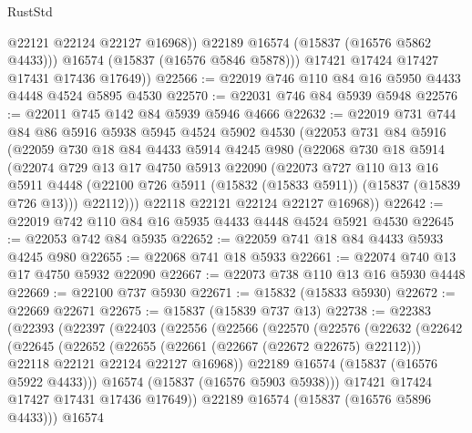 \begin{lexlean}{RustStd}
\begin{coremodule}
                @22121
                @22124
                @22127
                @16968))
            @22189
            @16574
            (@15837 (@16576 @5862 @4433)))
          @16574
          (@15837 (@16576 @5846 @5878)))
        @17421
        @17424
        @17427
        @17431
        @17436
        @17649))
@22566 := @22019 @746 @110 @84 @16 @5950 @4433 @4448 @4524 @5895 @4530
@22570 := @22031 @746 @84 @5939 @5948
@22576 := @22011 @745 @142 @84 @5939 @5946 @4666
@22632 := @22019
    @731
    @744
    @84
    @86
    @5916
    @5938
    @5945
    @4524
    @5902
    @4530
    (@22053
      @731
      @84
      @5916
      (@22059
        @730
        @18
        @84
        @4433
        @5914
        @4245
        @980
        (@22068
          @730
          @18
          @5914
          (@22074
            @729
            @13
            @17
            @4750
            @5913
            @22090
            (@22073
              @727
              @110
              @13
              @16
              @5911
              @4448
              (@22100 @726 @5911 (@15832 (@15833 @5911)) (@15837 (@15839 @726 @13)))
              @22112)))
        @22118
        @22121
        @22124
        @22127
        @16968))
@22642 := @22019 @742 @110 @84 @16 @5935 @4433 @4448 @4524 @5921 @4530
@22645 := @22053 @742 @84 @5935
@22652 := @22059 @741 @18 @84 @4433 @5933 @4245 @980
@22655 := @22068 @741 @18 @5933
@22661 := @22074 @740 @13 @17 @4750 @5932 @22090
@22667 := @22073 @738 @110 @13 @16 @5930 @4448
@22669 := @22100 @737 @5930
@22671 := @15832 (@15833 @5930)
@22672 := @22669 @22671
@22675 := @15837 (@15839 @737 @13)
@22738 := @22383
    (@22393
      (@22397
        (@22403
          (@22556
            (@22566
              (@22570
                (@22576
                  (@22632
                    (@22642
                      (@22645
                        (@22652
                          (@22655 (@22661 (@22667 (@22672 @22675) @22112)))
                          @22118
                          @22121
                          @22124
                          @22127
                          @16968))
                      @22189
                      @16574
                      (@15837 (@16576 @5922 @4433)))
                    @16574
                    (@15837 (@16576 @5903 @5938)))
                  @17421
                  @17424
                  @17427
                  @17431
                  @17436
                  @17649))
              @22189
              @16574
              (@15837 (@16576 @5896 @4433)))
            @16574

\end{coremodule}
\end{lexlean}
